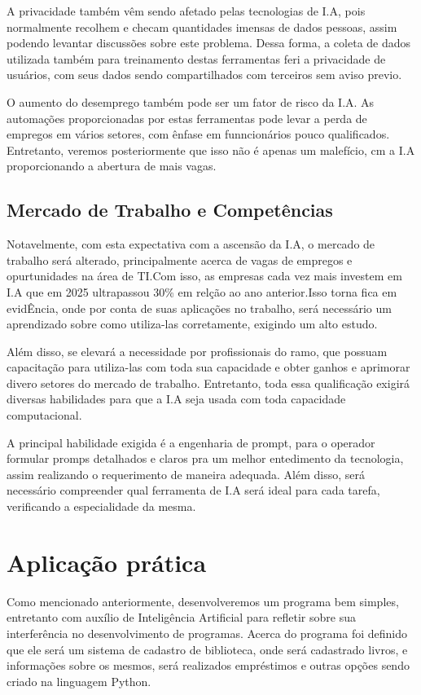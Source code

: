 \documentclass[12pt]{article}
\begin{document}
        A privacidade também vêm sendo afetado pelas tecnologias de I.A, pois normalmente recolhem e checam quantidades imensas de dados pessoas, assim podendo levantar discussões sobre este problema. Dessa forma, a coleta de dados utilizada também para treinamento destas ferramentas feri a privacidade de usuários, com seus dados sendo compartilhados com terceiros sem aviso previo.

        O aumento do desemprego também pode ser um fator de risco da I.A. As automações proporcionadas por estas ferramentas pode levar a perda de empregos em vários setores, com ênfase em funncionários pouco qualificados. Entretanto, veremos posteriormente que isso não é apenas um malefício, cm a I.A proporcionando a abertura de mais vagas.

    \subsection{Mercado de Trabalho e Competências}
        Notavelmente, com esta expectativa com a ascensão da I.A, o mercado de trabalho será alterado, principalmente acerca de vagas de empregos e opurtunidades na área de TI.Com isso, as empresas cada vez mais investem em I.A que em 2025 ultrapassou 30\% em relção ao ano anterior.Isso torna fica em evidÊncia, onde por conta de suas aplicações no trabalho, será necessário um aprendizado sobre como utiliza-las corretamente, exigindo um alto estudo.

        Além disso, se elevará a necessidade por profissionais do ramo, que possuam capacitação para utiliza-las com toda sua capacidade e obter ganhos e aprimorar divero setores do mercado de trabalho. Entretanto, toda essa qualificação exigirá diversas habilidades para que a I.A seja usada com toda capacidade computacional.

        A principal habilidade exigida é a engenharia de prompt, para o operador formular promps detalhados e claros pra um melhor entedimento da tecnologia, assim realizando o requerimento de maneira adequada. Além disso, será necessário compreender qual ferramenta de I.A será ideal para cada tarefa, verificando a especialidade da mesma.


    \section{Aplicação prática}

        Como mencionado anteriormente, desenvolveremos um programa bem simples, entretanto com auxílio de Inteligência Artificial para refletir sobre sua interferência no desenvolvimento de programas.
        Acerca do programa foi definido que ele será um sistema de cadastro de biblioteca, onde será cadastrado livros, e informações sobre os mesmos, será realizados empréstimos e outras opções sendo criado na linguagem Python.
\end{document}
